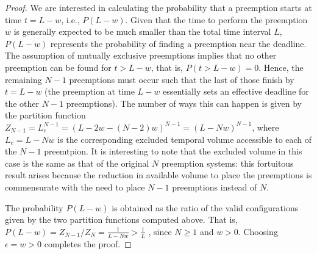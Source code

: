 \begin{proof}
We are interested in calculating the probability that a preemption starts at time $t=L-w$, i.e., $P(L-w)$. Given that the time to perform the preemption $w$ is generally expected to be much smaller than the total time interval $L$, $P(L-w)$ represents the probability of finding a preemption near the deadline. The assumption of mutually exclusive preemptions implies that no other preemption can be found for $t > L - w$, that is, $P(t> L-w) = 0$. Hence, the remaining $N-1$ preemptions must occur such that the last of those finish by $t=L-w$ (the preemption at time $L-w$ essentially sets an effective deadline for the other $N-1$ preemptions). The number of ways this can happen is given by the partition function $Z_{N-1} = L_e^{N-1}= (L-2w - (N-2)w)^{N-1} = (L - Nw)^{N-1}$, where $L_e = L - Nw$ is the corresponding excluded temporal volume accessible to each of the $N-1$ preemtpion. It is interesting to note that the excluded volume in this case is the same as that of the original $N$ preemption systems: this fortuitous result arises because the reduction in available volume to place the preemptions is commensurate with the need to place $N-1$ preemptions instead of $N$.

The probability $P(L-w)$ is obtained as the ratio of the valid configurations given by the two partition functions computed above.
That is, 
$P(L-w) = Z_{N-1}/ {Z_N} = \frac{1}{L - Nw} > \frac{1}{L}$ , since $N \geq 1$ and $w>0$. Choosing $\epsilon = w > 0$ completes the proof.




\end{proof}

